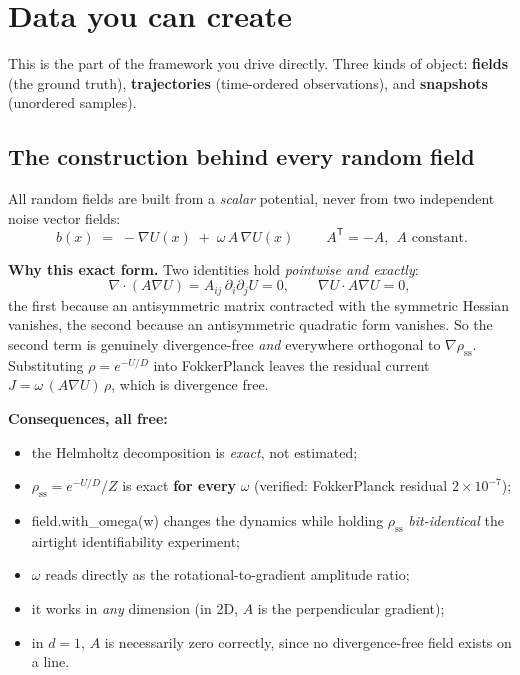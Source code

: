 \documentclass[11pt,a4paper]{article}
\newcommand{\code}[1]{{\ttfamily\small #1}}
\begin{document}
\section{Data you can create}

This is the part of the framework you drive directly. Three kinds of object:
\textbf{fields} (the ground truth), \textbf{trajectories} (time-ordered observations),
and \textbf{snapshots} (unordered samples).

\subsection{The construction behind every random field}

All random fields are built from a \emph{scalar} potential, never from two independent
noise vector fields:
\begin{equation}
  \boxed{\;b(x) \;=\; -\nabla U(x) \;+\; \omega\,A\,\nabla U(x)\;}
  \qquad A^{\mathsf T} = -A,\ \ A \text{ constant}.
  \label{eq:construction}
\end{equation}

\begin{keybox}
\textbf{Why this exact form.} Two identities hold \emph{pointwise and exactly}:
\[
  \nabla\!\cdot\!(A\nabla U) = A_{ij}\,\partial_i\partial_j U = 0,
  \qquad
  \nabla U \cdot A\nabla U = 0 ,
\]
the first because an antisymmetric matrix contracted with the symmetric Hessian
vanishes, the second because an antisymmetric quadratic form vanishes. So the second
term is genuinely divergence-free \emph{and} everywhere orthogonal to
$\nabla\rho_{\mathrm{ss}}$. Substituting $\rho = e^{-U/D}$ into Fokker\textendash{}Planck
leaves the residual current $J = \omega\,(A\nabla U)\,\rho$, which is divergence free.

\textbf{Consequences, all free:}
\begin{itemize}[leftmargin=1.2em,itemsep=1pt,topsep=2pt]
  \item the Helmholtz decomposition is \emph{exact}, not estimated;
  \item $\rho_{\mathrm{ss}} = e^{-U/D}/Z$ is exact \textbf{for every} $\omega$
        (verified: Fokker\textendash{}Planck residual $2\times10^{-7}$);
  \item \code{field.with\_omega(w)} changes the dynamics while holding
        $\rho_{\mathrm{ss}}$ \emph{bit-identical} \textemdash{} the airtight
        identifiability experiment;
  \item $\omega$ reads directly as the rotational-to-gradient amplitude ratio;
  \item it works in \emph{any} dimension (in 2D, $A$ is the perpendicular gradient);
  \item in $d=1$, $A$ is necessarily zero \textemdash{} correctly, since no
        divergence-free field exists on a line.
\end{itemize}
\end{keybox}
\end{document}
